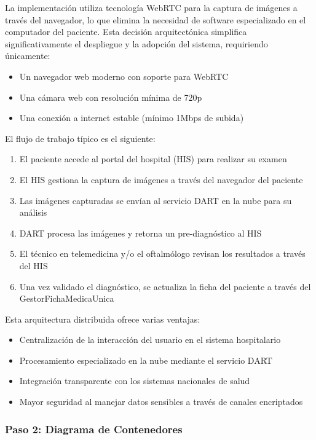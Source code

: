 La implementación utiliza tecnología WebRTC para la captura de imágenes a través del navegador, lo que elimina la necesidad de software especializado en el computador del paciente. Esta decisión arquitectónica simplifica significativamente el despliegue y la adopción del sistema, requiriendo únicamente:
\begin{itemize}
    \item Un navegador web moderno con soporte para WebRTC
    \item Una cámara web con resolución mínima de 720p
    \item Una conexión a internet estable (mínimo 1Mbps de subida)
\end{itemize}

El flujo de trabajo típico es el siguiente:
\begin{enumerate}
    \item El paciente accede al portal del hospital (HIS) para realizar su examen
    \item El HIS gestiona la captura de imágenes a través del navegador del paciente
    \item Las imágenes capturadas se envían al servicio DART en la nube para su análisis
    \item DART procesa las imágenes y retorna un pre-diagnóstico al HIS
    \item El técnico en telemedicina y/o el oftalmólogo revisan los resultados a través del HIS
    \item Una vez validado el diagnóstico, se actualiza la ficha del paciente a través del GestorFichaMedicaUnica
\end{enumerate}

Esta arquitectura distribuida ofrece varias ventajas:
\begin{itemize}
    \item Centralización de la interacción del usuario en el sistema hospitalario
    \item Procesamiento especializado en la nube mediante el servicio DART
    \item Integración transparente con los sistemas nacionales de salud
    \item Mayor seguridad al manejar datos sensibles a través de canales encriptados
\end{itemize}





\subsubsection{Paso 2: Diagrama de Contenedores}

